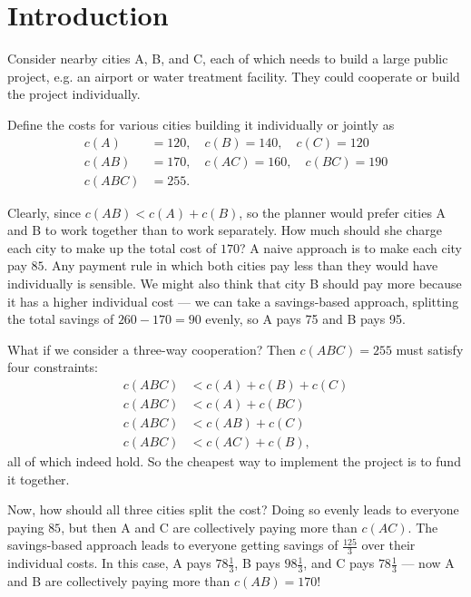 \section{Introduction}

\begin{example} \label{4-29-2}
	Consider nearby cities A, B, and C, each of which needs to build a large public project, e.g. an airport or water treatment facility. They could cooperate or build the project individually.

	Define the costs for various cities building it individually or jointly as
	\begin{align*}
		c(A) &= 120, \quad c(B) = 140, \quad c(C) = 120 \\
		c(AB) &= 170, \quad c(AC) = 160, \quad c(BC) = 190 \\
		c(ABC) &= 255
	.\end{align*}

	Clearly, since $c(AB) < c(A) + c(B)$, so the planner would prefer cities A and B to work together than to work separately. How much should she charge each city to make up the total cost of $170$? A naive approach is to make each city pay $85$. Any payment rule in which both cities pay less than they would have individually is sensible. We might also think that city B should pay more because it has a higher individual cost --- we can take a savings-based approach, splitting the total savings of $260 - 170 = 90$ evenly, so A pays 75 and B pays 95.

	What if we consider a three-way cooperation? Then $c(ABC) = 255$ must satisfy four constraints:
	\begin{align*}
		c(ABC) &< c(A) + c(B) + c(C) \\
		c(ABC) &< c(A) + c(BC) \\
		c(ABC) &< c(AB) + c(C) \\
		c(ABC) &< c(AC) + c(B)
	,\end{align*}
	all of which indeed hold. So the cheapest way to implement the project is to fund it together.

	Now, how should all three cities split the cost? Doing so evenly leads to everyone paying $85$, but then A and C are collectively paying more than $c(AC)$. The savings-based approach leads to everyone getting savings of $\frac{125}{3}$ over their individual costs. In this case, A pays $78 \frac{1}{3}$, B pays $98 \frac{1}{3}$, and C pays $78 \frac{1}{3}$ --- now A and B are collectively paying more than $c(AB) = 170$!
\end{example}

